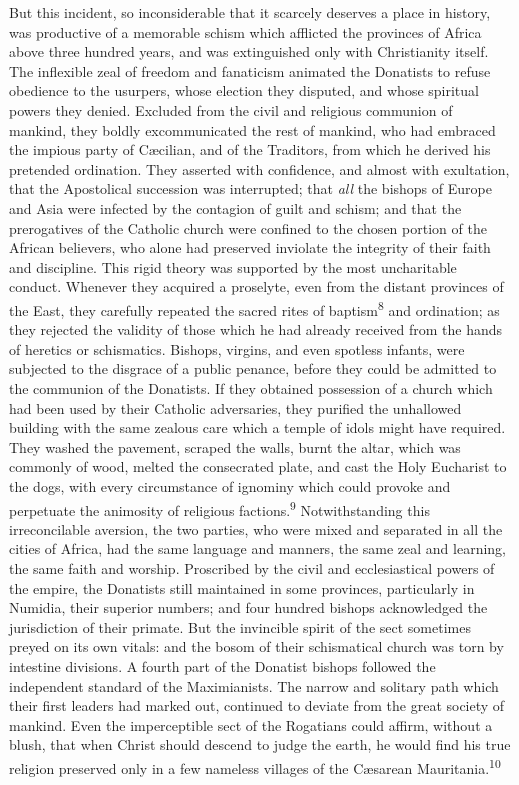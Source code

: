 But this incident, so inconsiderable that it scarcely deserves a
place in history, was productive of a memorable schism which
afflicted the provinces of Africa above three hundred years, and
was extinguished only with Christianity itself. The inflexible
zeal of freedom and fanaticism animated the Donatists to refuse
obedience to the usurpers, whose election they disputed, and
whose spiritual powers they denied. Excluded from the civil and
religious communion of mankind, they boldly excommunicated the
rest of mankind, who had embraced the impious party of Cæcilian,
and of the Traditors, from which he derived his pretended
ordination. They asserted with confidence, and almost with
exultation, that the Apostolical succession was interrupted; that
\textit{all} the bishops of Europe and Asia were infected by the
contagion of guilt and schism; and that the prerogatives of the
Catholic church were confined to the chosen portion of the
African believers, who alone had preserved inviolate the
integrity of their faith and discipline. This rigid theory was
supported by the most uncharitable conduct. Whenever they
acquired a proselyte, even from the distant provinces of the
East, they carefully repeated the sacred rites of baptism\textsuperscript{8} and
ordination; as they rejected the validity of those which he had
already received from the hands of heretics or schismatics.
Bishops, virgins, and even spotless infants, were subjected to
the disgrace of a public penance, before they could be admitted
to the communion of the Donatists. If they obtained possession of
a church which had been used by their Catholic adversaries, they
purified the unhallowed building with the same zealous care which
a temple of idols might have required. They washed the pavement,
scraped the walls, burnt the altar, which was commonly of wood,
melted the consecrated plate, and cast the Holy Eucharist to the
dogs, with every circumstance of ignominy which could provoke and
perpetuate the animosity of religious factions.\textsuperscript{9} Notwithstanding
this irreconcilable aversion, the two parties, who were mixed and
separated in all the cities of Africa, had the same language and
manners, the same zeal and learning, the same faith and worship.
Proscribed by the civil and ecclesiastical powers of the empire,
the Donatists still maintained in some provinces, particularly in
Numidia, their superior numbers; and four hundred bishops
acknowledged the jurisdiction of their primate. But the
invincible spirit of the sect sometimes preyed on its own vitals:
and the bosom of their schismatical church was torn by intestine
divisions. A fourth part of the Donatist bishops followed the
independent standard of the Maximianists. The narrow and solitary
path which their first leaders had marked out, continued to
deviate from the great society of mankind. Even the imperceptible
sect of the Rogatians could affirm, without a blush, that when
Christ should descend to judge the earth, he would find his true
religion preserved only in a few nameless villages of the
Cæsarean Mauritania.\textsuperscript{10}

